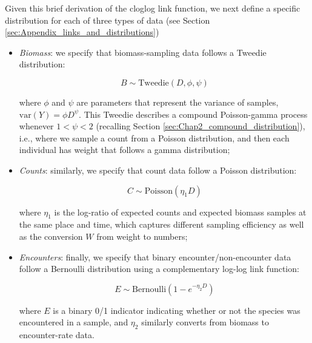 Given this brief derivation of the cloglog link function, we next define a specific distribution for each of three types of data (see Section \ref{sec:Appendix_links_and_distributions})
\begin{itemize}
    \item \textit{Biomass}:  we specify that biomass-sampling data follows a Tweedie distribution:

\begin{equation}
    B \sim \mathrm{Tweedie}( D, \phi, \psi )
\end{equation}

   where \(\phi\) and \(\psi\) are parameters that represent the variance of samples, \(\mathrm{var}(Y)= \phi D^{\psi} \). This Tweedie describes a compound Poisson-gamma process whenever \(1 < \psi < 2\) (recalling Section \ref{sec:Chap2_compound_distribution}), i.e., where we sample a count from a Poisson distribution, and then each individual has weight that follows a gamma distribution;  

   \item \textit{Counts}:  similarly, we specify that count data follow a Poisson distribution:
   
\begin{equation}
    C \sim \mathrm{Poisson}( \eta_1 D )  
\end{equation}

   where \( \eta_1 \) is the log-ratio of expected counts and expected biomass samples at the same place and time, which captures different sampling efficiency as well as the conversion \(W\) from weight to numbers;

   \item \textit{Encounters}:  finally, we specify that binary encounter/non-encounter data follow a Bernoulli distribution using a complementary log-log link function:

\begin{equation}
    E \sim \mathrm{Bernoulli}\left( 1 - e^{-\eta_2 D} \right) 
\end{equation}

   where \(E\) is a binary 0/1 indicator indicating whether or not the species was encountered in a sample, and \( \eta_2 \) similarly converts from biomass to encounter-rate data.  
\end{itemize}
